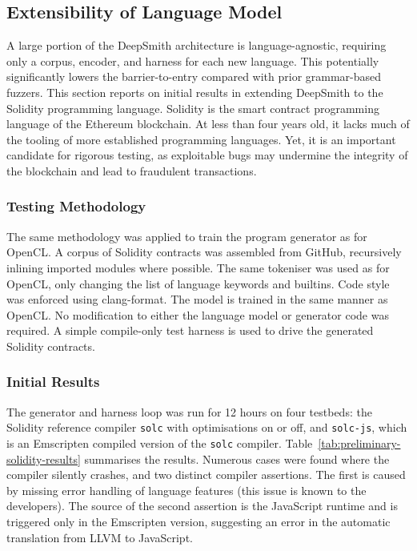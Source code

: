 \subsection{Extensibility of Language Model}
\label{subsec:deepsmith-solidity-extensibility}



A large portion of the DeepSmith architecture is language-agnostic, requiring only a corpus, encoder, and harness for each new language. This potentially significantly lowers the barrier-to-entry compared with prior grammar-based fuzzers. This section reports on initial results in extending DeepSmith to the Solidity programming language. Solidity is the smart contract programming language of the Ethereum blockchain. At less than four years old, it lacks much of the tooling of more established programming languages. Yet, it is an important candidate for rigorous testing, as exploitable bugs may undermine the integrity of the blockchain and lead to fraudulent transactions.


\subsubsection{Testing Methodology}

The same methodology was applied to train the program generator as for OpenCL. A corpus of Solidity contracts was assembled from GitHub, recursively inlining imported modules where possible. The same tokeniser was used as for OpenCL, only changing the list of language keywords and builtins. Code style was enforced using clang-format. The model is trained in the same manner as OpenCL. No modification to either the language model or generator code was required. A simple compile-only test harness is used to drive the generated Solidity contracts.


\subsubsection{Initial Results}

The generator and harness loop was run for 12 hours on four testbeds: the Solidity reference compiler \texttt{solc} with optimisations on or off, and \texttt{solc-js}, which is an Emscripten compiled version of the \texttt{solc} compiler. Table~\ref{tab:preliminary-solidity-results} summarises the results. Numerous cases were found where the compiler silently crashes, and two distinct compiler assertions. The first is caused by missing error handling of language features (this issue is known to the developers). The source of the second assertion is the JavaScript runtime and is triggered only in the Emscripten version, suggesting an error in the automatic translation from LLVM to JavaScript.


